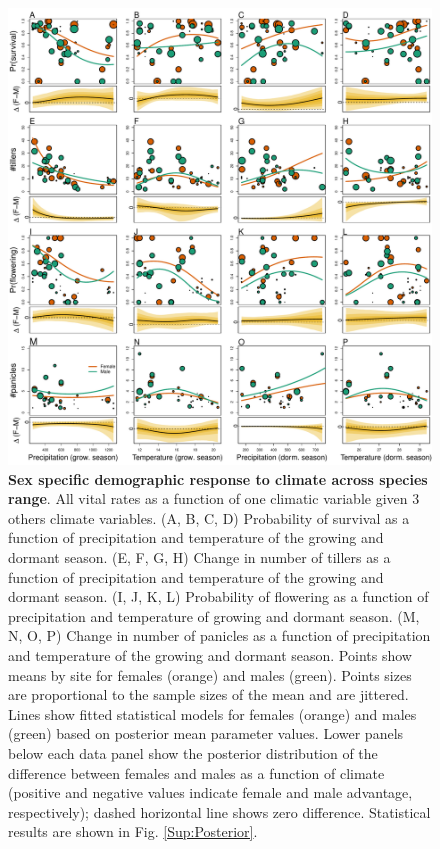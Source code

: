 \documentclass[12pt]{article}
\begin{document}
\begin{figure}[H]
  \begin{center}
    \includegraphics[width=0.95\linewidth]{Figures/vital_rates.pdf}
  \caption{\textbf{Sex specific demographic response to climate across species range}.
  All vital rates as a function of one climatic variable given 3 others climate variables.
  (A, B, C, D) Probability of survival as a function of precipitation and temperature of the growing and dormant season.
  (E, F, G, H) Change in number of tillers as a function of precipitation and temperature of the growing and dormant season.
  (I, J, K, L) Probability of flowering as a function of precipitation and temperature of growing and dormant season.
  (M, N, O, P) Change in number of panicles as a function of precipitation and temperature of the growing and dormant season.
  Points show means by site for females (orange) and males (green). 
  Points sizes are proportional to the sample sizes of the mean and are jittered.
  Lines show fitted statistical models for females (orange) and males (green) based on posterior mean parameter values.
  Lower panels below each data panel show the posterior distribution of the difference between females and males as a function of climate (positive and negative values indicate female and male advantage, respectively); dashed horizontal line shows zero difference.
  Statistical results are shown in Fig. \ref{Sup:Posterior}.}
  \label{fig:vital_rates}
  \end{center}
\end{figure}
\end{document}

